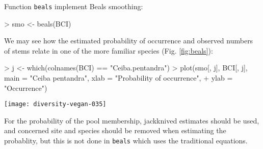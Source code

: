 \documentclass[a4paper,10pt]{amsart}
\begin{document}
Function \texttt{beals} implement Beals smoothing:
\begin{Schunk}
\begin{Sinput}
> smo <- beals(BCI)
\end{Sinput}
\end{Schunk}
We may see how the estimated probability of occurrence and observed
numbers of stems relate in one of the more familiar species
(Fig. \ref{fig:beals}):
\begin{Schunk}
\begin{Sinput}
> j <- which(colnames(BCI) == "Ceiba.pentandra")
> plot(smo[, j], BCI[, j], main = "Ceiba pentandra", xlab = "Probability of occurrence", 
+     ylab = "Occurrence")
\end{Sinput}
\end{Schunk}
\begin{SCfigure}
\texttt{[image: diversity-vegan-035]}
\caption{Beals smoothing for \emph{Ceiba pentandra}.}
\label{fig:beals}
\end{SCfigure}
For the probability of the pool membership, jackknived estimates
should be used, and concerned site and species should be removed when
estimating the probablity, but this is not done in \texttt{beals}
which uses the traditional equations.
\end{document}

